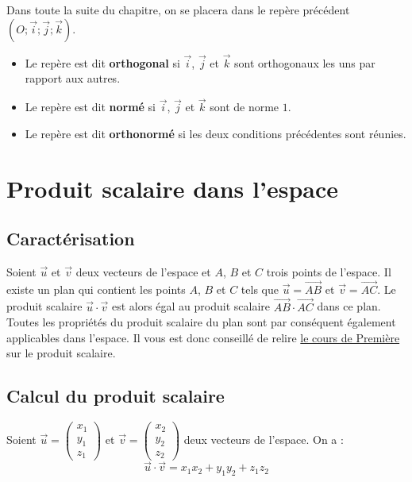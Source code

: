 	Dans toute la suite du chapitre, on se placera dans le repère précédent $(O ; \overrightarrow{i} ; \overrightarrow{j} ; \overrightarrow{k})$.

	\begin{formula}
		\entretitreetliste
		\begin{itemize}
			\item Le repère est dit \textbf{orthogonal} si $\overrightarrow{i}$, $\overrightarrow{j}$ et $\overrightarrow{k}$ sont orthogonaux les uns par rapport aux autres.
			\item Le repère est dit \textbf{normé} si $\overrightarrow{i}$, $\overrightarrow{j}$ et $\overrightarrow{k}$ sont de norme $1$.
			\item Le repère est dit \textbf{orthonormé} si les deux conditions précédentes sont réunies.
		\end{itemize}
	\end{formula}

	\section{Produit scalaire dans l'espace}

	\subsection{Caractérisation}

	Soient $\overrightarrow{u}$ et $\overrightarrow{v}$ deux vecteurs de l'espace et $A$, $B$ et $C$ trois points de l'espace. Il existe un plan qui contient les points $A$, $B$ et $C$ tels que $\overrightarrow{u} = \overrightarrow{AB}$ et $\overrightarrow{v} = \overrightarrow{AC}$. Le produit scalaire $\overrightarrow{u} \cdot \overrightarrow{v}$ est alors égal au produit scalaire $\overrightarrow{AB} \cdot \overrightarrow{AC}$ dans ce plan.
	\newpar
	Toutes les propriétés du produit scalaire du plan sont par conséquent également applicables dans l'espace. Il vous est donc conseillé de relire \href{https://bacomathiqu.es/cours/premiere/geometrie-reperee/le-produit-scalaire}{le cours de Première} sur le produit scalaire.

	\subsection{Calcul du produit scalaire}

	\begin{formula}
		Soient $\overrightarrow{u} = \begin{pmatrix} {x_1} \\ {y_1} \\ {z_1} \end{pmatrix}$ et $\overrightarrow{v} = \begin{pmatrix} {x_2} \\ {y_2} \\ {z_2} \end{pmatrix}$ deux vecteurs de l'espace.
		\newpar
		On a :
		\[ \overrightarrow{u} \cdot \overrightarrow{v} = x_1x_2 + y_1y_2 + z_1z_2 \]
	\end{formula}

